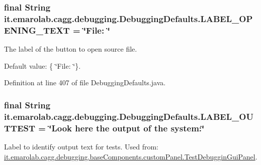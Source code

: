 \hypertarget{classit_1_1emarolab_1_1cagg_1_1debugging_1_1DebuggingDefaults_aababae04f814e284df9a8f436053b0e5}{
\subsubsection[{L\-A\-B\-E\-L\-\_\-\-O\-P\-E\-N\-I\-N\-G\-\_\-\-T\-E\-X\-T}]{\setlength{\rightskip}{0pt plus 5cm}final String it.\-emarolab.\-cagg.\-debugging.\-Debugging\-Defaults.\-L\-A\-B\-E\-L\-\_\-\-O\-P\-E\-N\-I\-N\-G\-\_\-\-T\-E\-X\-T = \char`\"{}File\-: \char`\"{}\hspace{0.3cm}{\ttfamily [static]}}}\label{classit_1_1emarolab_1_1cagg_1_1debugging_1_1DebuggingDefaults_aababae04f814e284df9a8f436053b0e5}
The label of the button to open source file. \par
 Default value\-: \{ \char`\"{}\-File\-: \char`\"{}\}. 

Definition at line 407 of file Debugging\-Defaults.\-java.

\hypertarget{classit_1_1emarolab_1_1cagg_1_1debugging_1_1DebuggingDefaults_adefd4db05f3d950b413f9f0abadc33f1}{
\subsubsection[{L\-A\-B\-E\-L\-\_\-\-O\-U\-T\-T\-E\-S\-T}]{\setlength{\rightskip}{0pt plus 5cm}final String it.\-emarolab.\-cagg.\-debugging.\-Debugging\-Defaults.\-L\-A\-B\-E\-L\-\_\-\-O\-U\-T\-T\-E\-S\-T = \char`\"{}Look here the output of the system\-:\char`\"{}\hspace{0.3cm}{\ttfamily [static]}}}\label{classit_1_1emarolab_1_1cagg_1_1debugging_1_1DebuggingDefaults_adefd4db05f3d950b413f9f0abadc33f1}
Label to identify output text for tests. Used from\-: \hyperlink{classit_1_1emarolab_1_1cagg_1_1debugging_1_1baseComponents_1_1customPanel_1_1TestDebugginGuiPanel}{it.\-emarolab.\-cagg.\-debugging.\-base\-Components.\-custom\-Panel.\-Test\-Debuggin\-Gui\-Panel}. 

